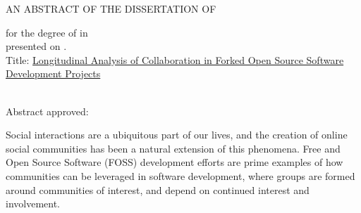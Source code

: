 \documentclass[12pt,letterpaper]{gthesis2}  %
\begin{document}
%
%














%
%
%
%
\clearpage %
%
%
%
\begin{center}
AN ABSTRACT OF THE DISSERTATION OF
\end{center}
\vspace{\baselineskip}
%
\underline{\myname} for the degree of
\underline{\mydegree} in\\ \underline{\mymajor} presented on
\underline{\myday}. \\
%
\newline
%
Title: \underline{Longitudinal Analysis of Collaboration in Forked Open Source Software}\\ \underline{Development Projects}
\vspace*{\baselineskip}
\hfil\strut\\
\noindent Abstract approved: \hrulefill\\
\phantom{Abstract approved:\ }\hfil\myadvisor\hfil\break

%
%
\indent Social interactions are a ubiquitous part of our lives, and the creation of online social communities has been a natural extension of this phenomena. Free and Open Source Software (FOSS) development efforts are prime examples of how communities can be leveraged in software development, where groups are formed around communities of interest, and depend on continued interest and involvement. 
\end{document}
